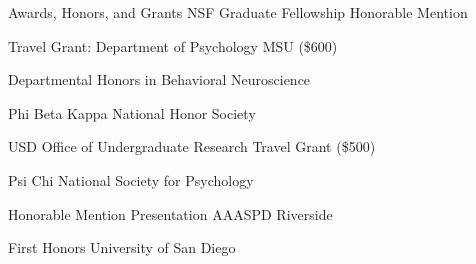 
\begin{rubric}{Awards, Honors, and Grants}
\entry*[April 2018]
	NSF Graduate Fellowship Honorable Mention

\entry*[March 2018]
	Travel Grant: Department of Psychology MSU (\$600)
	
\entry*[May 2016]
	Departmental Honors in Behavioral Neuroscience
	
\entry*[February 2016]
	Phi Beta Kappa National Honor Society
	
\entry*[January 2016]
	USD Office of Undergraduate Research Travel Grant (\$500)
	
\entry*[April 2015]
	Psi Chi National Society for Psychology
	
\entry*[June 2014]
	Honorable Mention Presentation AAASPD Riverside
	
\entry*[2012 - 2016]
	First Honors University of San Diego
	
\end{rubric}
